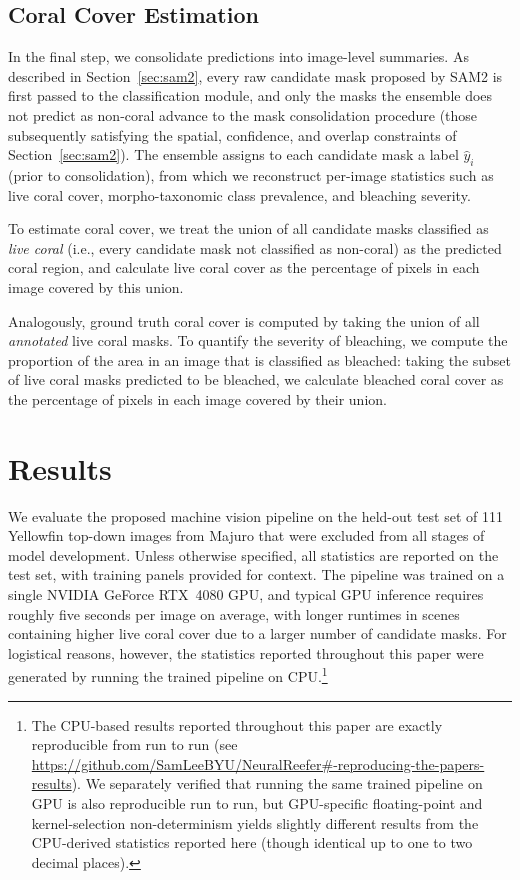 \documentclass[11pt]{elsarticle}
\begin{document}
\subsection{Coral Cover Estimation} \label{sec:reconstruct}

In the final step, we consolidate predictions into image-level summaries. As described in Section~\ref{sec:sam2}, every raw candidate mask proposed by SAM2 is first passed to the classification module, and only the masks the ensemble does not predict as non-coral advance to the mask consolidation procedure (those subsequently satisfying the spatial, confidence, and overlap constraints of Section~\ref{sec:sam2}). The ensemble assigns to each candidate mask a label $\hat{y}_i$ (prior to consolidation), from which we reconstruct per-image statistics such as live coral cover, morpho-taxonomic class prevalence, and bleaching severity.

To estimate coral cover, we treat the union of all candidate masks classified as \emph{live coral} (i.e., every candidate mask not classified as non-coral) as the predicted coral region, and calculate live coral cover as the percentage of pixels in each image covered by this union.

Analogously, ground truth coral cover is computed by taking the union of all \emph{annotated} live coral masks.
To quantify the severity of bleaching, we compute the proportion of the area in an image that is classified as bleached: taking the subset of live coral masks predicted to be bleached, we calculate bleached coral cover as the percentage of pixels in each image covered by their union.

\section{Results}
\label{sec:results}

We evaluate the proposed machine vision pipeline on the held-out test set of 111 Yellowfin top-down images from Majuro that were excluded from all stages of model development. Unless otherwise specified, all statistics are reported on the test set, with training panels provided for context. The pipeline was trained on a single NVIDIA GeForce RTX~4080 GPU, and typical GPU inference requires roughly five seconds per image on average, with longer runtimes in scenes containing higher live coral cover due to a larger number of candidate masks. For logistical reasons, however, the statistics reported throughout this paper were generated by running the trained pipeline on CPU.\footnote{The CPU-based results reported throughout this paper are exactly reproducible from run to run (see \href{https://github.com/SamLeeBYU/NeuralReefer\#-reproducing-the-papers-results}{https://github.com/SamLeeBYU/NeuralReefer\#-reproducing-the-papers-results}). We separately verified that running the same trained pipeline on GPU is also reproducible run to run, but GPU-specific floating-point and kernel-selection non-determinism yields slightly different results from the CPU-derived statistics reported here (though identical up to one to two decimal places).}
\end{document}
